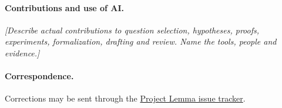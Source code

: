 \documentclass[11pt]{article}
\newcommand{\DraftField}[1]{\textit{[#1]}}
\begin{document}
\paragraph{Contributions and use of AI.} \DraftField{Describe actual contributions to question selection, hypotheses, proofs, experiments, formalization, drafting and review. Name the tools, people and evidence.}
\paragraph{Correspondence.} Corrections may be sent through the
\href{https://github.com/troytsv/project-lemma/issues}{Project Lemma issue tracker}.
\end{document}
